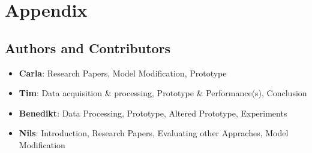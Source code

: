 \documentclass[a4paper, 11pt]{article}
\begin{document}
\section*{Appendix}
\begin{flushleft}
\subsection*{Authors and Contributors}
\begin{itemize}
    \item \textbf{Carla}: Research Papers, Model Modification, Prototype
    \item \textbf{Tim}: Data acquisition \& processing, Prototype \& Performance(s), Conclusion \\
    \item \textbf{Benedikt}: Data Processing, Prototype, Altered Prototype, Experiments \\
    \item \textbf{Nils}: Introduction, Research Papers, Evaluating other Appraches, Model Modification
\end{itemize}

\end{flushleft}
\end{document}
